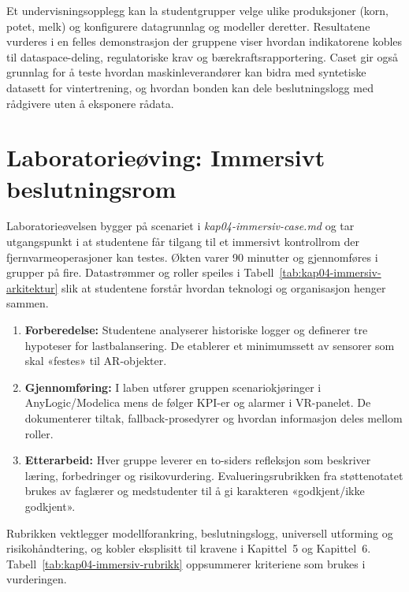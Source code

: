 Et undervisningsopplegg kan la studentgrupper velge ulike produksjoner (korn, potet, melk) og konfigurere datagrunnlag og modeller deretter. Resultatene vurderes i en felles demonstrasjon der gruppene viser hvordan indikatorene kobles til dataspace-deling, regulatoriske krav og bærekraftsrapportering. Caset gir også grunnlag for å teste hvordan maskinleverandører kan bidra med syntetiske datasett for vintertrening, og hvordan bonden kan dele beslutningslogg med rådgivere uten å eksponere rådata.

\section{Laboratorieøving: Immersivt beslutningsrom}
Laboratorieøvelsen bygger på scenariet i \textit{kap04-immersiv-case.md} og tar utgangspunkt i at studentene får tilgang til et immersivt kontrollrom der fjernvarmeoperasjoner kan testes. Økten varer 90 minutter og gjennomføres i grupper på fire. Datastrømmer og roller speiles i Tabell~\ref{tab:kap04-immersiv-arkitektur} slik at studentene forstår hvordan teknologi og organisasjon henger sammen.

\begin{enumerate}
    \item \textbf{Forberedelse:} Studentene analyserer historiske logger og definerer tre hypoteser for lastbalansering. De etablerer et minimumssett av sensorer som skal «festes» til AR-objekter.
    \item \textbf{Gjennomføring:} I laben utfører gruppen scenariokjøringer i AnyLogic/Modelica mens de følger KPI-er og alarmer i VR-panelet. De dokumenterer tiltak, fallback-prosedyrer og hvordan informasjon deles mellom roller.
    \item \textbf{Etterarbeid:} Hver gruppe leverer en to-siders refleksjon som beskriver læring, forbedringer og risikovurdering. Evalueringsrubrikken fra støttenotatet brukes av faglærer og medstudenter til å gi karakteren «godkjent/ikke godkjent».
\end{enumerate}

Rubrikken vektlegger modellforankring, beslutningslogg, universell utforming og risikohåndtering, og kobler eksplisitt til kravene i Kapittel~5 og Kapittel~6. Tabell~\ref{tab:kap04-immersiv-rubrikk} oppsummerer kriteriene som brukes i vurderingen.

